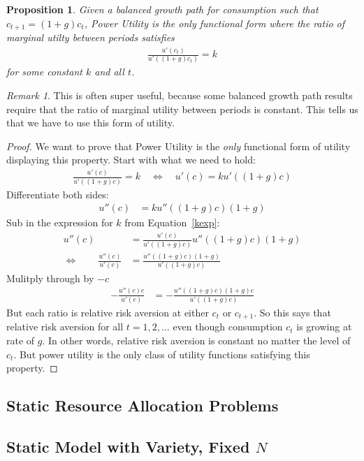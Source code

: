 \documentclass[12pt]{article}
\theoremstyle{plain}
\newtheorem{prop}[thm]{Proposition}
\theoremstyle{definition}
\theoremstyle{remark}
\newtheorem*{rmk}{Remark}
\begin{document}
\begin{prop}
Given a balanced growth path for consumption such that
$c_{t+1} = (1+g) c_{t}$,
Power Utility is the only functional form where the ratio of marginal
utilty between periods satisfies
\begin{align*}
  \frac{u'(c_t)}{u'((1+g)c_t)} = k
\end{align*}
for some constant $k$ and all $t$.
\end{prop}
\begin{rmk}
This is often super useful, because some balanced growth path results
require that the ratio of marginal utility between periods is constant.
This tells us that we have to use this form of utility.
\end{rmk}
\begin{proof}
We want to prove that Power Utility is the \emph{only} functional form
of utility displaying this property. Start with what we need to hold:
\begin{align}
  \frac{u'(c)}{u'((1+g)c)} = k
  \quad\iff\quad
  u'(c) = ku'((1+g)c)
  \label{kexp}
\end{align}
Differentiate both sides:
\begin{align*}
  u''(c) &= ku''((1+g)c)(1+g)
\end{align*}
Sub in the expression for $k$ from Equation~\ref{kexp}:
\begin{align*}
  u''(c) &=
  \frac{u'(c)}{u'((1+g)c)} u''((1+g)c)(1+g) \\
  \iff \qquad
  \frac{u''(c)}{u'(c)} &=
  \frac{u''((1+g)c)(1+g)}{u'((1+g)c)}
\end{align*}
Mulitply through by $-c$
\begin{align*}
  -\frac{u''(c)c}{u'(c)} &=
  -\frac{u''((1+g)c)(1+g)c}{u'((1+g)c)}
\end{align*}
But each ratio is relative risk aversion at either $c_t$ or $c_{t+1}$.
So this says that relative risk aversion for all $t=1,2,\ldots$ even
though consumption $c_t$ is growing at rate of $g$. In other words,
relative risk aversion is constant no matter the level of $c_t$. But
power utility is the only class of utility functions satisfying this
property.
\end{proof}

\clearpage
\subsection{Static Resource Allocation Problems}


\clearpage
\subsection{Static Model with Variety, Fixed $N$}
\end{document}

